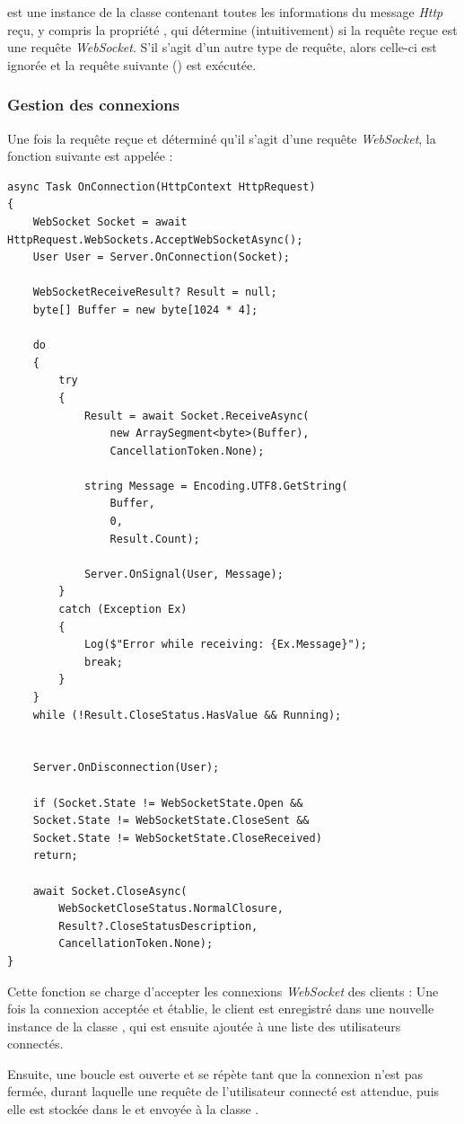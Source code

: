 \documentclass[12pt]{report}
\begin{document}
	 est une instance de la classe  contenant toutes les informations du message \textit{Http} reçu, y compris la propriété , qui détermine (intuitivement) si la requête reçue est une requête \textit{WebSocket}. S'il s'agit d'un autre type de requête, alors celle-ci est ignorée et la requête suivante () est exécutée.
	
	\subsubsection{Gestion des connexions}
	
	Une fois la requête reçue et déterminé qu’il s’agit d’une requête \textit{WebSocket}, la fonction  suivante est appelée :
	
	\begin{verbatim}
async Task OnConnection(HttpContext HttpRequest)
{
	WebSocket Socket = await HttpRequest.WebSockets.AcceptWebSocketAsync();
	User User = Server.OnConnection(Socket);
	
	WebSocketReceiveResult? Result = null;
	byte[] Buffer = new byte[1024 * 4];
	
	do
	{
		try
		{
			Result = await Socket.ReceiveAsync(
				new ArraySegment<byte>(Buffer), 
				CancellationToken.None);
			
			string Message = Encoding.UTF8.GetString(
				Buffer, 
				0, 
				Result.Count);
			
			Server.OnSignal(User, Message);
		}
		catch (Exception Ex)
		{
			Log($"Error while receiving: {Ex.Message}");
			break;
		}
	}
	while (!Result.CloseStatus.HasValue && Running);
	
	
	Server.OnDisconnection(User);
	
	if (Socket.State != WebSocketState.Open &&
	Socket.State != WebSocketState.CloseSent &&
	Socket.State != WebSocketState.CloseReceived)
	return;
	
	await Socket.CloseAsync(
		WebSocketCloseStatus.NormalClosure, 
		Result?.CloseStatusDescription, 
		CancellationToken.None);
}
	\end{verbatim}
	
	Cette fonction se charge d'accepter les connexions \textit{WebSocket} des clients : Une fois la connexion acceptée et établie, le client est enregistré dans une nouvelle instance de la classe , qui est ensuite ajoutée à une liste des utilisateurs connectés.
	
	Ensuite, une boucle est ouverte et se répète tant que la connexion n'est pas fermée, durant laquelle une requête de l'utilisateur connecté est attendue, puis elle est stockée dans le  et envoyée à la classe .
	
\end{document}
